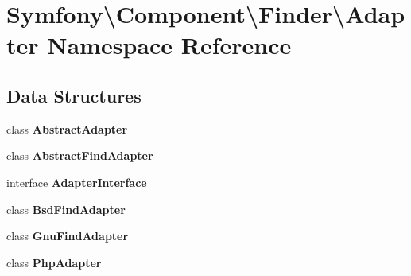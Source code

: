 \section{Symfony\textbackslash{}Component\textbackslash{}Finder\textbackslash{}Adapter Namespace Reference}
\label{namespace_symfony_1_1_component_1_1_finder_1_1_adapter}
\subsection*{Data Structures}
\begin{DoxyCompactItemize}
\item 
class {\bf Abstract\+Adapter}
\item 
class {\bf Abstract\+Find\+Adapter}
\item 
interface {\bf Adapter\+Interface}
\item 
class {\bf Bsd\+Find\+Adapter}
\item 
class {\bf Gnu\+Find\+Adapter}
\item 
class {\bf Php\+Adapter}
\end{DoxyCompactItemize}
